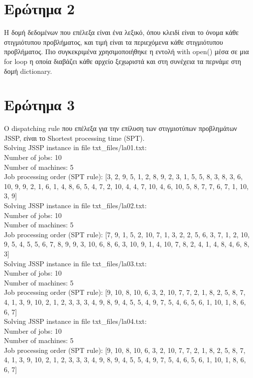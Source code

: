 \documentclass[paper=a4, fontsize=11pt]{scrartcl}
\numberwithin{equation}{section}		%
\numberwithin{figure}{section}			%
\numberwithin{table}{section}				%
\begin{document}
	
\section*{Ερώτημα 2}
Η δομή δεδομένων που επέλεξα είναι ένα λεξικό, όπου κλειδί είναι το όνομα κάθε στιγμιότυπου προβλήματος, και τιμή είναι τα περιεχόμενα κάθε στιγμιότυπου προβλήματος. Πιο συγκεκριμένα χρησιμοποιήθηκε η εντολή with open() μέσα σε μια for loop η οποία διαβάζει κάθε αρχείο ξεχωριστά και στη συνέχεια τα περνάμε στη δομή dictionary. 
    
    
\section*{Ερώτημα 3}
Ο dispatching rule που επέλεξα για την επίλυση των στιγμιοτύπων προβλημάτων JSSP, είναι το Shortest processing time (SPT). \\
Solving JSSP instance in file txt\_files/la01.txt: \\
Number of jobs: 10 \\
Number of machines: 5 \\
Job processing order (SPT rule): [3, 2, 9, 5, 1, 2, 8, 9, 2, 3, 1, 5, 5, 8, 3, 8, 3, 6, 10, 9, 9, 2, 1, 6, 1, 4, 8, 6, 5, 4, 7, 2, 10, 4, 4, 7, 10, 4, 6, 10, 5, 8, 7, 7, 6, 7, 1, 10, 3, 9] \\


Solving JSSP instance in file txt\_files/la02.txt: \\
Number of jobs: 10 \\
Number of machines: 5  \\
Job processing order (SPT rule): [7, 9, 1, 5, 2, 10, 7, 1, 3, 2, 2, 5, 6, 3, 7, 1, 2, 10, 9, 5, 4, 5, 5, 6, 7, 8, 9, 9, 3, 10, 6, 8, 6, 3, 10, 9, 1, 4, 10, 7, 8, 2, 4, 1, 4, 8, 4, 6, 8, 3] \\


Solving JSSP instance in file txt\_files/la03.txt: \\
Number of jobs: 10 \\
Number of machines: 5 \\
Job processing order (SPT rule): [9, 10, 8, 10, 6, 3, 2, 10, 7, 7, 2, 1, 8, 2, 5, 8, 7, 4, 1, 3, 9, 10, 2, 1, 2, 3, 3, 3, 4, 9, 8, 9, 4, 5, 5, 4, 9, 7, 5, 4, 6, 5, 6, 1, 10, 1, 8, 6, 6, 7] \\


Solving JSSP instance in file txt\_files/la04.txt: \\
Number of jobs: 10 \\ 
Number of machines: 5 \\ 
Job processing order (SPT rule): [9, 10, 8, 10, 6, 3, 2, 10, 7, 7, 2, 1, 8, 2, 5, 8, 7, 4, 1, 3, 9, 10, 2, 1, 2, 3, 3, 3, 4, 9, 8, 9, 4, 5, 5, 4, 9, 7, 5, 4, 6, 5, 6, 1, 10, 1, 8, 6, 6, 7] \\
\end{document}
